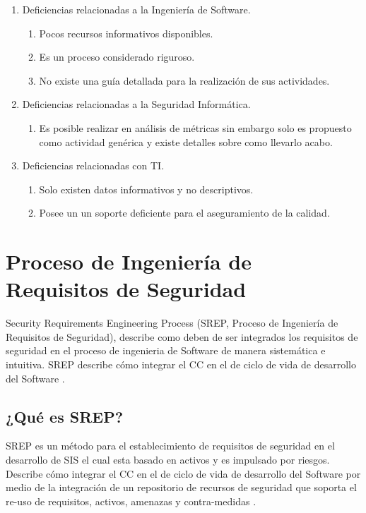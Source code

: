 \documentclass[runningheads,a4paper]{llncs}
\begin{document}
\begin{enumerate}
	\item Deficiencias relacionadas a la Ingeniería de \gls{Software}.
		\begin{enumerate}
			\item Pocos recursos informativos disponibles. 
			\item Es un proceso considerado riguroso.
			\item No existe una guía detallada para la realización de sus actividades.\\
			
		\end{enumerate}
	\item Deficiencias relacionadas a la Seguridad Informática.
		\begin{enumerate}
			\item Es posible realizar en análisis de métricas sin embargo solo es propuesto como actividad genérica y existe detalles sobre como llevarlo acabo.\\
			
		\end{enumerate}
	\item Deficiencias relacionadas con \gls{TI}.
		\begin{enumerate}
			\item Solo existen datos informativos y no descriptivos.
			\item Posee un un soporte deficiente para el aseguramiento de la calidad.
			
		\end{enumerate}
\end{enumerate}

\section{Proceso de Ingeniería de Requisitos de Seguridad}
Security Requirements Engineering Process (SREP, Proceso de Ingeniería de Requisitos de Seguridad), describe como deben de ser integrados los requisitos de seguridad en el proceso de ingenieria de \gls{Software} de manera sistemática e intuitiva. \gls{SREP} describe cómo integrar el \gls{CC} en el de ciclo de vida de desarrollo del \gls{Software} \cite{SREPMellado}.  

\subsection{¿Qué es \gls{SREP}?}
\gls{SREP} es un método para el establecimiento de requisitos de seguridad en el desarrollo de \gls{SIS} el cual esta basado en activos y es impulsado por riesgos. Describe cómo integrar el \gls{CC} en el de ciclo de vida de desarrollo del \gls{Software} por medio de la integración de un repositorio de recursos de seguridad que soporta el re-uso de requisitos, activos, amenazas y contra-medidas  \cite{SREPMellado}.\\
\end{document}
